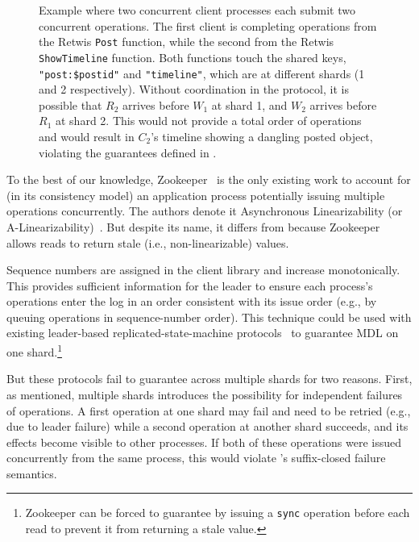 \begin{figure}[!tb]
\begin{tikzpicture}
\end{tikzpicture}
    \caption{Example where two concurrent client processes each submit two concurrent operations. The first client is completing operations from the Retwis \texttt{Post} function, while the second from the Retwis \texttt{ShowTimeline} function. Both functions touch the shared keys, \texttt{"post:\$postid"} and \texttt{"timeline"}, which are at different shards (1 and 2 respectively). Without coordination in the protocol, it is possible that $R_2$ arrives before $W_1$ at shard 1, and $W_2$ arrives before $R_1$ at shard 2. This would not provide a total order of operations and would result in $C_2$'s timeline showing a dangling posted object, violating the guarantees defined in \mdl{}.}
    \label{fig:concurrentbatches}
\end{figure}

To the best of our knowledge, Zookeeper~\cite{hunt2010zookeeper} is the
only existing work to account for (in its consistency model) an 
application process potentially issuing multiple operations concurrently. The authors denote it Asynchronous Linearizability
(or A-Linearizability)~\cite{hunt2010zookeeper}. But despite its name,
it differs from \MDL{} because Zookeeper allows
reads to return stale (i.e., non-linearizable) values.


 Sequence numbers are assigned in the client 
library and increase monotonically. This provides sufficient information for
the leader to ensure each process's operations enter the log in an
order consistent with its issue order
(e.g., by queuing operations in sequence-number order).
This technique could be used with existing leader-based replicated-state-machine
protocols~\cite{ongaro2014raft,lamport1998paxos,oki1988vr} to guarantee
MDL on one shard.\footnote{Zookeeper can be forced to
guarantee \MDL{} by issuing a \texttt{sync} operation before each read to prevent it from returning a stale value.}

But these protocols fail to 
guarantee \MDL{} across multiple shards for two reasons. First,
as mentioned, multiple shards
introduces the possibility for independent failures of operations. A first
operation at one shard may fail and need to be retried (e.g., due to
leader failure) while a second operation at another shard succeeds, and
its effects become visible to other processes. If both of these
operations were issued concurrently from the same process, 
this would violate \MDL{}'s suffix-closed failure semantics.

